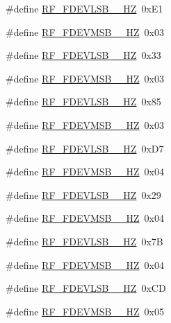 \begin{DoxyCompactItemize}
\item 
\#define \mbox{\hyperlink{sx1276_regs-_fsk_8h_a8e69ee5a2729700dda58111180fae357}{R\+F\+\_\+\+F\+D\+E\+V\+L\+S\+B\+\_\+\_\+\+HZ}}~0x\+E1
\item 
\#define \mbox{\hyperlink{sx1276_regs-_fsk_8h_a2d77a912cc45a97d9fffaeafa791b186}{R\+F\+\_\+\+F\+D\+E\+V\+M\+S\+B\+\_\+\_\+\+HZ}}~0x03
\item 
\#define \mbox{\hyperlink{sx1276_regs-_fsk_8h_a1675346ade9c8f671aac79a317512699}{R\+F\+\_\+\+F\+D\+E\+V\+L\+S\+B\+\_\+\_\+\+HZ}}~0x33
\item 
\#define \mbox{\hyperlink{sx1276_regs-_fsk_8h_a2727b4b04f0a27d9f370c8f2b47e81fb}{R\+F\+\_\+\+F\+D\+E\+V\+M\+S\+B\+\_\+\_\+\+HZ}}~0x03
\item 
\#define \mbox{\hyperlink{sx1276_regs-_fsk_8h_a01b1b43aab91e76e84d00af78699ceba}{R\+F\+\_\+\+F\+D\+E\+V\+L\+S\+B\+\_\+\_\+\+HZ}}~0x85
\item 
\#define \mbox{\hyperlink{sx1276_regs-_fsk_8h_a0ca702dda690369e62b5225d3e5425e8}{R\+F\+\_\+\+F\+D\+E\+V\+M\+S\+B\+\_\+\_\+\+HZ}}~0x03
\item 
\#define \mbox{\hyperlink{sx1276_regs-_fsk_8h_ab739890a1c4948ba9df80139f9e90c66}{R\+F\+\_\+\+F\+D\+E\+V\+L\+S\+B\+\_\+\_\+\+HZ}}~0x\+D7
\item 
\#define \mbox{\hyperlink{sx1276_regs-_fsk_8h_a1d9bb9563e152c76f7cbb9df5e1b36c4}{R\+F\+\_\+\+F\+D\+E\+V\+M\+S\+B\+\_\+\_\+\+HZ}}~0x04
\item 
\#define \mbox{\hyperlink{sx1276_regs-_fsk_8h_a8036d3d91106128102f59ddecacd4dc3}{R\+F\+\_\+\+F\+D\+E\+V\+L\+S\+B\+\_\+\_\+\+HZ}}~0x29
\item 
\#define \mbox{\hyperlink{sx1276_regs-_fsk_8h_a3e130dcdc84aa5685b7bc35edf6027f2}{R\+F\+\_\+\+F\+D\+E\+V\+M\+S\+B\+\_\+\_\+\+HZ}}~0x04
\item 
\#define \mbox{\hyperlink{sx1276_regs-_fsk_8h_af2c378fd0b423a7ab42424b045402936}{R\+F\+\_\+\+F\+D\+E\+V\+L\+S\+B\+\_\+\_\+\+HZ}}~0x7B
\item 
\#define \mbox{\hyperlink{sx1276_regs-_fsk_8h_a95625bf09af0cd2a50f00f182a14746d}{R\+F\+\_\+\+F\+D\+E\+V\+M\+S\+B\+\_\+\_\+\+HZ}}~0x04
\item 
\#define \mbox{\hyperlink{sx1276_regs-_fsk_8h_a556565ac523c78650661dce1450dcaf7}{R\+F\+\_\+\+F\+D\+E\+V\+L\+S\+B\+\_\+\_\+\+HZ}}~0x\+CD
\item 
\#define \mbox{\hyperlink{sx1276_regs-_fsk_8h_af8cf1be1a66c7f6f63c4c73a2603657a}{R\+F\+\_\+\+F\+D\+E\+V\+M\+S\+B\+\_\+\_\+\+HZ}}~0x05

\end{DoxyCompactItemize}
